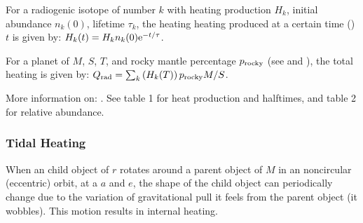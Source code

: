 \documentclass[letterpaper,10pt,english]{sphinxmanual}
\begin{document}
\sphinxAtStartPar
For a radiogenic isotope of number \(k\) with heating production \(H_k\), initial abundance \(n_k (0)\),
lifetime \(\tau_k\), the heating heating produced at a certain time ({\hyperref[\detokenize{quantities/life/age:id1}]{}}) \(t\)
is given by: \(H_k(t) = H_k n_k (0) {\rm e}^{- t / \tau}\).

\sphinxAtStartPar
For a planet of {\hyperref[\detokenize{quantities/material/mass:id1}]{}} \(M\), {\hyperref[\detokenize{quantities/geometric/surface_area:id1}]{}} \(S\),
{\hyperref[\detokenize{quantities/life/age:id1}]{}} \(T\), and rocky mantle percentage \(p_{\rm rocky}\) (see {\hyperref[\detokenize{quantities/material/chemical_composition:id1}]{}}
and {\hyperref[\detokenize{quantities/material/composition_type:id1}]{}}), the total heating is given by:
\(Q_{\rm rad} = \sum_k \left(H_k(T)\right) p_{\rm rocky} M / S\).

\sphinxAtStartPar
More information on:
.
See table 1 for heat production and half\sphinxhyphen{}times, and table 2 for relative abundance.


\subsubsection{Tidal Heating}
\label{\detokenize{quantities/surface/internal_heating/tidal_heating:tidal-heating}}\label{\detokenize{quantities/surface/internal_heating/tidal_heating::doc}}\label{\detokenize{quantities/surface/internal_heating/tidal_heating:id1}}
\sphinxAtStartPar
When an child object of {\hyperref[\detokenize{quantities/geometric/radius:id1}]{}} \(r\) rotates around a parent object
of {\hyperref[\detokenize{quantities/material/mass:id1}]{}} \(M\) in an non\sphinxhyphen{}circular (eccentric) orbit, at a
{\hyperref[\detokenize{quantities/orbital/semi_major_axis:id1}]{}} \(a\) and {\hyperref[\detokenize{quantities/orbital/eccentricity:id1}]{}} \(e\),
the shape of the child object can periodically change due to the variation of gravitational pull
it feels from the parent object (it wobbles). This motion results in internal heating.
\end{document}
